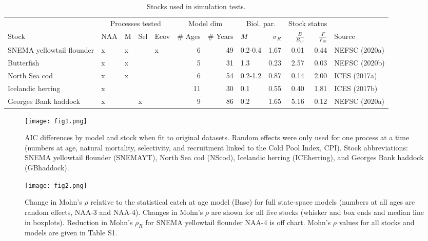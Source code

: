 \documentclass[]{article}
\begin{document}
\begin{landscape}
\begin{table}

\caption{\label{tab:stock-list}Stocks used in simulation tests.}
\centering
\begin{tabular}[t]{lllllrrlrrrl}
\toprule
\multicolumn{1}{c}{ } & \multicolumn{4}{c}{Processes tested} & \multicolumn{2}{c}{Model dim} & \multicolumn{2}{c}{Biol. par.} & \multicolumn{2}{c}{Stock status} \\
\cmidrule(l{3pt}r{3pt}){2-5} \cmidrule(l{3pt}r{3pt}){6-7} \cmidrule(l{3pt}r{3pt}){8-9} \cmidrule(l{3pt}r{3pt}){10-11}
Stock & NAA & M & Sel & Ecov & \# Ages & \# Years & $M$ & $\sigma_R$ & $\frac{B}{B_{40}}$ & $\frac{F}{F_{40}}$ & Source\\
\midrule
SNEMA yellowtail flounder & x & x &  & x & 6 & 49 & 0.2-0.4 & 1.67 & 0.01 & 0.44 & NEFSC (2020a)\\
Butterfish & x & x &  &  & 5 & 31 & 1.3 & 0.23 & 2.57 & 0.03 & NEFSC (2020b)\\
North Sea cod & x & x &  &  & 6 & 54 & 0.2-1.2 & 0.87 & 0.14 & 2.00 & ICES (2017a)\\
Icelandic herring & x &  &  &  & 11 & 30 & 0.1 & 0.55 & 0.40 & 1.81 & ICES (2017b)\\
Georges Bank haddock & x &  & x &  & 9 & 86 & 0.2 & 1.65 & 5.16 & 0.12 & NEFSC (2020a)\\
\bottomrule
\end{tabular}
\end{table}
\end{landscape}

\pagebreak

\begin{landscape}
\begin{figure}

{\centering \texttt{[image: fig1.png]}

}

\caption{AIC differences by model and stock when fit to original datasets. Random effects were only used for one process at a time (numbers at age, natural mortality, selectivity, and recruitment linked to the Cold Pool Index, CPI). Stock abbreviations: SNEMA yellowtail flounder (SNEMAYT), North Sea cod (NScod), Icelandic herring (ICEherring), and Georges Bank haddock (GBhaddock).}\label{fig:daic}
\end{figure}
\end{landscape}

\pagebreak

\begin{figure}

{\centering \texttt{[image: fig2.png]}

}

\caption{Change in Mohn's $\rho$ relative to the statistical catch at age model (Base) for full state-space models (numbers at all ages are random effects, NAA-3 and NAA-4). Changes in Mohn's $\rho$ are shown for all five stocks (whisker and box ends and median line in boxplots). Reduction in Mohn's $\rho_R$ for SNEMA yellowtail flounder NAA-4 is off chart. Mohn's $\rho$ values for all stocks and models are given in Table S1.}\label{fig:mohns}
\end{figure}
\end{document}
